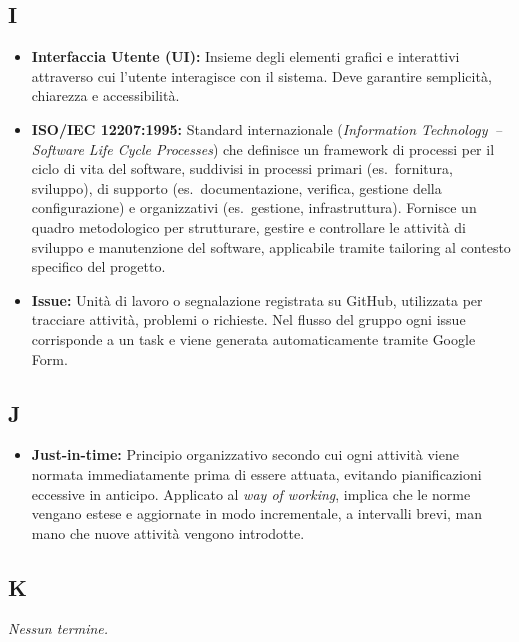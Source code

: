 \subsection*{I}
\begin{itemize}[leftmargin=*]
      \item \textbf{Interfaccia Utente (UI):} Insieme degli elementi grafici e interattivi attraverso cui l'utente interagisce con il sistema. Deve garantire semplicità, chiarezza e accessibilità.
      \item \textbf{ISO/IEC 12207:1995:} Standard internazionale
            (\textit{Information Technology~-- Software Life Cycle Processes})
            che definisce un framework di processi per il ciclo di vita del software,
            suddivisi in processi primari (es.\ fornitura, sviluppo), di supporto
            (es.\ documentazione, verifica, gestione della configurazione) e
            organizzativi (es.\ gestione, infrastruttura). Fornisce un quadro
            metodologico per strutturare, gestire e controllare le attività di
            sviluppo e manutenzione del software, applicabile tramite tailoring al
            contesto specifico del progetto.
      \item \textbf{Issue:} Unità di lavoro o segnalazione registrata su GitHub,
            utilizzata per tracciare attività, problemi o richieste. Nel flusso del
            gruppo ogni issue corrisponde a un task e viene generata automaticamente
            tramite Google Form.
\end{itemize}
 
{}
\subsection*{J}
\begin{itemize}[leftmargin=*]
    \item \textbf{Just-in-time:} Principio organizzativo secondo cui ogni attività
          viene normata immediatamente prima di essere attuata, evitando
          pianificazioni eccessive in anticipo. Applicato al \textit{way of working},
          implica che le norme vengano estese e aggiornate in modo incrementale,
          a intervalli brevi, man mano che nuove attività vengono introdotte.
\end{itemize}
 
{}
\subsection*{K}
\textit{Nessun termine.}
 
